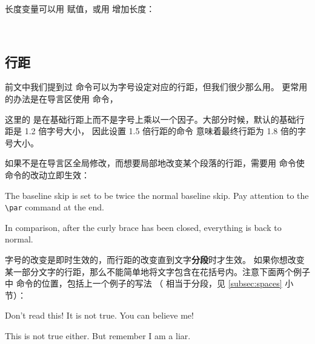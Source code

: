 长度变量可以用  赋值，或用  增加长度：
\begin{command}
 \\
\end{command}

\subsection{行距}\label{subsec:linespread}

前文中我们提到过  命令可以为字号设定对应的行距，但我们很少那么用。
更常用的办法是在导言区使用  命令，
\begin{command}
\end{command}

这里的  是在基础行距上而不是字号上乘以一个因子。大部分时候，默认的基础行距是 1.2 倍字号大小，
因此设置 1.5 倍行距的命令  意味着最终行距为 1.8 倍的字号大小。

如果不是在导言区全局修改，而想要局部地改变某个段落的行距，需要用  命令使  命令的改动立即生效：
\begin{example}
{\linespread{2.0}\selectfont
The baseline skip is set to be
twice the normal baseline skip. 
Pay attention to the \verb|\par|
command at the end. \par}

In comparison, after the
curly brace has been closed,
everything is back to normal.
\end{example}

字号的改变是即时生效的，而行距的改变直到文字\textbf{分段}时才生效。
如果你想改变某一部分文字的行距，那么不能简单地将文字包含在花括号内。注意下面两个例子中  命令的位置，包括上一个例子的写法
（ 相当于分段，见 \ref{subsec:spaces} 小节）：
\begin{example}
{\Large Don't read this!
 It is not true.
 You can believe me!\par}
\end{example}

\begin{example}
{\Large This is not true either.
But remember I am a liar.}\par
\end{example}

